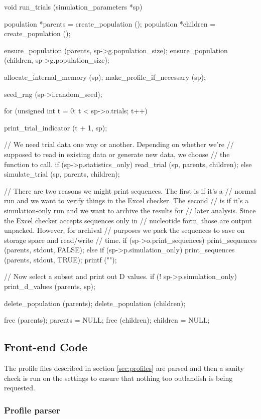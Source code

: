 \documentclass{article}
\begin{document}
\begin{ccode}
void run_trials (simulation_parameters *sp) {
  population *parents = create_population ();
  population *children = create_population ();

  ensure_population (parents, sp->g.population_size);
  ensure_population (children, sp->g.population_size);

  allocate_internal_memory (sp);
  make_profile_if_necessary (sp);

  seed_rng (sp->i.random_seed);

  for (unsigned int t = 0; t < sp->o.trials; t++) {
    print_trial_indicator (t + 1, sp);

    // We need trial data one way or another. Depending on whether we're
    // supposed to read in existing data or generate new data, we choose
    // the function to call.
    if (sp->p.statistics_only)
      read_trial (sp, parents, children);
    else
      simulate_trial (sp, parents, children);
    
    // There are two reasons we might print sequences. The first is if it's a
    // normal run and we want to verify things in the Excel checker. The second
    // is if it's a simulation-only run and we want to archive the results for
    // later analysis. Since the Excel checker accepts sequences only in
    // nucleotide form, those are output unpacked. However, for archival
    // purposes we pack the sequences to save on storage space and read/write
    // time.
    if (sp->o.print_sequences)
      print_sequences (parents, stdout, FALSE);
    else if (sp->p.simulation_only) {
      print_sequences (parents, stdout, TRUE);
      printf ("\n");
    }

    // Now select a subset and print out D values.
    if (! sp->p.simulation_only)
      print_d_values (parents, sp);
  }

  delete_population (parents);
  delete_population (children);

  free (parents); parents = NULL;
  free (children); children = NULL;
}
\end{ccode}

    \subsection{Front-end Code}

      The profile files described in section \ref{sec:profiles} are parsed and
      then a sanity check is run on the settings to ensure that nothing too
      outlandish is being requested.

      \subsubsection{Profile parser}
	\label{sec:profile-parser}
\end{document}
